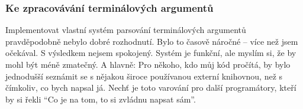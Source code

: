 \documentclass{article}
\begin{document}
\subsubsection*{Ke zpracovávání terminálových argumentů}
Implementovat vlastní systém parsování terminálových argumentů pravděpodobně
nebylo dobré rozhodnutí. Bylo to časově náročné -- více než jsem očekával.
S výsledkem nejsem spokojený. Systém je funkční, ale myslím si, že by mohl být
méně zmatečný. A hlavně: Pro někoho, kdo můj kód pročítá, by bylo jednodušší
seznámit se s nějakou široce používanou externí knihovnou, než s čímkoliv, co
bych napsal já. Nechť je toto varování pro další programátory, kteří by si
řekli \enquote{Co je na tom, to si zvládnu napsat sám}.


\printbibliography
\end{document}
